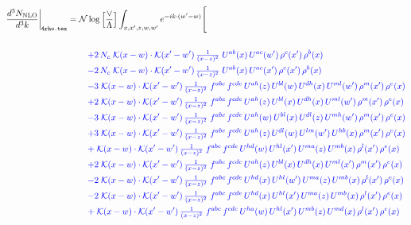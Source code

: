 \documentclass[10pt]{article}
\numberwithin{equation}{section}
\newcommand{\NN}{\mathcal N}
\begin{document}
\begin{align}
\frac{d^3N_{\rm NLO}}{d^3k}\bigg|_{\texttt{4rho.tex}}={}&\NN\log\Big[\frac{\vee}{\Lambda}\Big]\int_{x,x',z,w,w'}e^{-ik\cdot(w'-w)}\Bigg[\notag\\
\notag\\
&\quad{\color{blue}+2\,N_c\;\mathcal{K}(x-w)\cdot\mathcal{K}(x'-w')\,\tfrac{1}{(x-z)^{2}}\;U^{ab}(x)\,U^{ac}(w')\,\rho^{c}(x')\,\rho^{b}(x)}\notag\\
&\quad{\color{blue}-2\,N_c\;\mathcal{K}(x-w)\cdot\mathcal{K}(x'-w')\,\tfrac{1}{(x-z)^{2}}\;U^{ab}(x)\,U^{ac}(x')\,\rho^{c}(x')\,\rho^{b}(x)}\notag\\
&\quad{\color{blue}-3\;\mathcal{K}(x-w)\cdot\mathcal{K}(x'-w')\,\tfrac{1}{(x-z)^{2}}\;f^{abc}\,f^{cde}\,U^{ah}(z)\,U^{bl}(w)\,U^{dh}(x)\,U^{ml}(w')\,\rho^{m}(x')\,\rho^{e}(x)}\notag\\
&\quad{\color{blue}+2\;\mathcal{K}(x-w)\cdot\mathcal{K}(x'-w')\,\tfrac{1}{(x-z)^{2}}\;f^{abc}\,f^{cde}\,U^{ah}(z)\,U^{bl}(x)\,U^{dh}(x)\,U^{ml}(w')\,\rho^{m}(x')\,\rho^{e}(x)}\notag\\
&\quad{\color{blue}-3\;\mathcal{K}(x-w)\cdot\mathcal{K}(x'-w')\,\tfrac{1}{(x-z)^{2}}\;f^{abc}\,f^{cde}\,U^{ah}(w)\,U^{bl}(x)\,U^{dl}(z)\,U^{mh}(w')\,\rho^{m}(x')\,\rho^{e}(x)}\notag\\
&\quad{\color{blue}+3\;\mathcal{K}(x-w)\cdot\mathcal{K}(x'-w')\,\tfrac{1}{(x-z)^{2}}\;f^{abc}\,f^{cde}\,U^{ah}(z)\,U^{dl}(w)\,U^{lm}(w')\,U^{hb}(x)\,\rho^{m}(x')\,\rho^{e}(x)}\notag\\
&\quad{\color{blue}+\;\mathcal{K}(x-w)\cdot\mathcal{K}(x'-w')\,\tfrac{1}{(x-z)^{2}}\;f^{abc}\,f^{cde}\,U^{hd}(w)\,U^{hl}(x')\,U^{ma}(z)\,U^{mb}(x)\,\rho^{l}(x')\,\rho^{e}(x)}\notag\\
&\quad{\color{blue}+2\;\mathcal{K}(x-w)\cdot\mathcal{K}(x'-w')\,\tfrac{1}{(x-z)^{2}}\;f^{abc}\,f^{cde}\,U^{ah}(z)\,U^{bl}(x)\,U^{dh}(x)\,U^{ml}(x')\,\rho^{m}(x')\,\rho^{e}(x)}\notag\\
&\quad{\color{blue}-2\;\mathcal{K}(x-w)\cdot\mathcal{K}(x'-w')\,\tfrac{1}{(x-z)^{2}}\;f^{abc}\,f^{cde}\,U^{hd}(x)\,U^{hl}(w')\,U^{ma}(z)\,U^{mb}(x)\,\rho^{l}(x')\,\rho^{e}(x)}\notag\\
&\quad{\color{blue}-2\;\mathcal{K}(x-w)\cdot\mathcal{K}(x'-w')\,\tfrac{1}{(x-z)^{2}}\;f^{abc}\,f^{cde}\,U^{hd}(x)\,U^{hl}(x')\,U^{ma}(z)\,U^{mb}(x)\,\rho^{l}(x')\,\rho^{e}(x)}\notag\\
&\quad{\color{blue}+\;\mathcal{K}(x-w)\cdot\mathcal{K}(x'-w')\,\tfrac{1}{(x-z)^{2}}\;f^{abc}\,f^{cde}\,U^{ha}(w)\,U^{hl}(x')\,U^{mb}(z)\,U^{md}(x)\,\rho^{l}(x')\,\rho^{e}(x)}\notag\\

\end{align}
\end{document}
